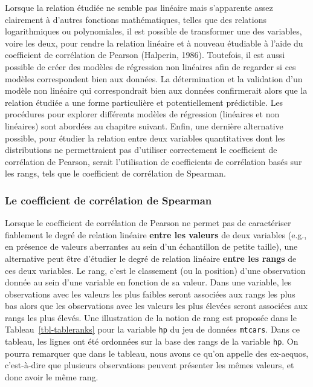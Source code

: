 \documentclass[
  letterpaper,
]{book}
\begin{document}
Lorsque la relation étudiée ne semble pas linéaire mais s'apparente
assez clairement à d'autres fonctions mathématiques, telles que des
relations logarithmiques ou polynomiales, il est possible de transformer
une des variables, voire les deux, pour rendre la relation linéaire et à
nouveau étudiable à l'aide du coefficient de corrélation de Pearson
(Halperin, 1986). Toutefois, il est aussi possible de créer des modèles
de régression non linéaires afin de regarder si ces modèles
correspondent bien aux données. La détermination et la validation d'un
modèle non linéaire qui correspondrait bien aux données confirmerait
alors que la relation étudiée a une forme particulière et
potentiellement prédictible. Les procédures pour explorer différents
modèles de régression (linéaires et non linéaires) sont abordées au
chapitre suivant. Enfin, une dernière alternative possible, pour étudier
la relation entre deux variables quantitatives dont les distributions ne
permettraient pas d'utiliser correctement le coefficient de corrélation
de Pearson, serait l'utilisation de coefficients de corrélation basés
sur les rangs, tels que le coefficient de corrélation de Spearman.

\subsubsection{Le coefficient de corrélation de
Spearman}\label{le-coefficient-de-corruxe9lation-de-spearman}

Lorsque le coefficient de corrélation de Pearson ne permet pas de
caractériser fiablement le degré de relation linéaire \textbf{entre les
valeurs} de deux variables (e.g., en présence de valeurs aberrantes au
sein d'un échantillon de petite taille), une alternative peut être
d'étudier le degré de relation linéaire \textbf{entre les rangs} de ces
deux variables. Le rang, c'est le classement (ou la position) d'une
observation donnée au sein d'une variable en fonction de sa valeur. Dans
une variable, les observations avec les valeurs les plus faibles seront
associées aux rangs les plus bas alors que les observations avec les
valeurs les plus élevées seront associées aux rangs les plus élevés. Une
illustration de la notion de rang est proposée dans le
Tableau~\ref{tbl-tableranks} pour la variable \texttt{hp} du jeu de
données \texttt{mtcars}. Dans ce tableau, les lignes ont été ordonnées
sur la base des rangs de la variable \texttt{hp}. On pourra remarquer
que dans le tableau, nous avons ce qu'on appelle des ex-aequos,
c'est-à-dire que plusieurs observations peuvent présenter les mêmes
valeurs, et donc avoir le même rang.
\end{document}
